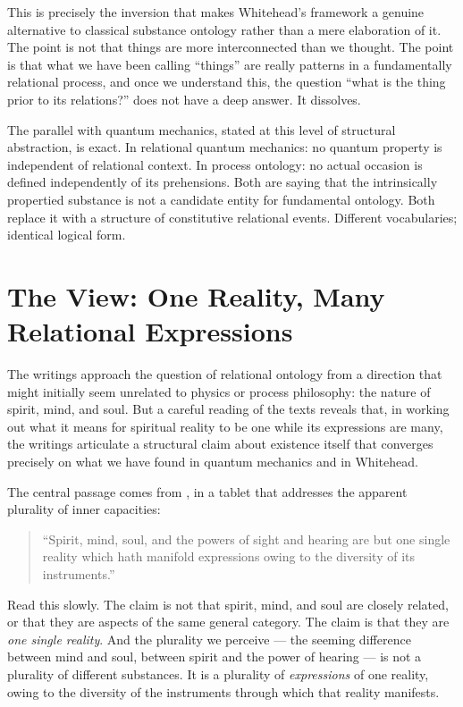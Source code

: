This is precisely the inversion that makes Whitehead's framework a genuine alternative to classical substance ontology rather than a mere elaboration of it. The point is not that things are more interconnected than we thought. The point is that what we have been calling ``things'' are really patterns in a fundamentally relational process, and once we understand this, the question ``what is the thing prior to its relations?'' does not have a deep answer. It dissolves.

The parallel with quantum mechanics, stated at this level of structural abstraction, is exact. In relational quantum mechanics: no quantum property is independent of relational context. In process ontology: no actual occasion is defined independently of its prehensions. Both are saying that the intrinsically propertied substance is not a candidate entity for fundamental ontology. Both replace it with a structure of constitutive relational events. Different vocabularies; identical logical form.

\section{The \bahai View: One Reality, Many Relational Expressions}
\label{sec:ch7-bahai}

The \bahai writings approach the question of relational ontology from a direction that might initially seem unrelated to physics or process philosophy: the nature of spirit, mind, and soul. But a careful reading of the texts reveals that, in working out what it means for spiritual reality to be one while its expressions are many, the writings articulate a structural claim about existence itself that converges precisely on what we have found in quantum mechanics and in Whitehead.

The central passage comes from \Bahaullah, in a tablet that addresses the apparent plurality of inner capacities:

\begin{quote}
``Spirit, mind, soul, and the powers of sight and hearing are but one single reality which hath manifold expressions owing to the diversity of its instruments.''
\citep[para.~35]{SummonsLordHosts}
\end{quote}

Read this slowly. The claim is not that spirit, mind, and soul are closely related, or that they are aspects of the same general category. The claim is that they are \emph{one single reality}. And the plurality we perceive --- the seeming difference between mind and soul, between spirit and the power of hearing --- is not a plurality of different substances. It is a plurality of \emph{expressions} of one reality, owing to the diversity of the instruments through which that reality manifests.

